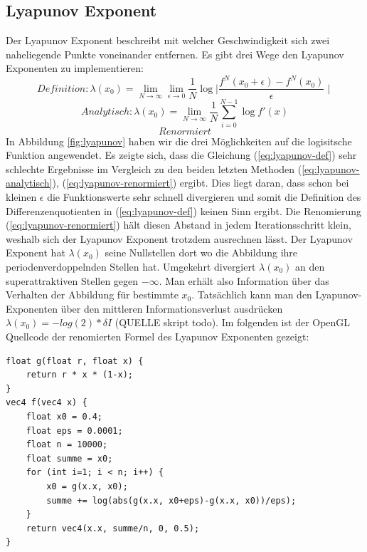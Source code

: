 \documentclass{scrartcl}
\begin{document}
\subsection{Lyapunov Exponent}
Der Lyapunov Exponent beschreibt mit welcher Geschwindigkeit sich zwei naheliegende Punkte voneinander entfernen. 
Es gibt drei Wege den Lyapunov Exponenten zu implementieren:
\begin{equation}
Definition: \lambda(x_0) = \lim_{N \rightarrow \infty}\lim_{\epsilon \rightarrow 0} \frac{1}{N}\log{\mid \frac{f^N(x_0+\epsilon)- f^N(x_0)}{\epsilon} \mid} 
\label{eq:lyapunov-def}
\end{equation}
\begin{equation}
Analytisch: \lambda(x_0) = \lim_{N \rightarrow \infty} \frac{1}{N} \sum_{i=0}^{N-1}  \log{f'(x)} 
\label{eq:lyapunov-analytisch}
\end{equation}
\begin{equation}
Renormiert
\label{eq:lyapunov-renormiert}
\end{equation}
In Abbildung \ref{fig:lyapunov} haben wir die drei Möglichkeiten auf die logisitsche Funktion angewendet.
Es zeigte sich, dass die Gleichung (\ref{eq:lyapunov-def}) sehr schlechte Ergebnisse im Vergleich zu den beiden letzten Methoden (\ref{eq:lyapunov-analytisch}), (\ref{eq:lyapunov-renormiert}) ergibt.
Dies liegt daran, dass schon bei kleinen $\epsilon$ die Funktionswerte sehr schnell divergieren und somit die Definition des Differenzenquotienten in (\ref{eq:lyapunov-def}) keinen Sinn ergibt.
Die Renomierung (\ref{eq:lyapunov-renormiert}) hält diesen Abstand in jedem Iterationsschritt klein, weshalb sich der Lyapunov Exponent trotzdem ausrechnen lässt.
Der Lyapunov Exponent hat $\lambda(x_0)$ seine Nullstellen dort wo die Abbildung ihre periodenverdoppelnden Stellen hat. Umgekehrt divergiert $\lambda(x_0)$ an den superattraktiven Stellen gegen $-\infty$.
Man erhält also Information über das Verhalten der Abbildung für bestimmte $x_0$.
Tatsächlich kann man den Lyapunov-Exponenten über den mittleren Informationsverlust ausdrücken $\lambda(x_0)=-log(2)*\delta I$ (QUELLE skript todo).
Im folgenden ist der OpenGL Quellcode der renomierten Formel des Lyapunov Exponenten gezeigt:
\begin{lstlisting}
float g(float r, float x) {
    return r * x * (1-x);
}
vec4 f(vec4 x) {
    float x0 = 0.4;
    float eps = 0.0001;
    float n = 10000;
    float summe = x0;
    for (int i=1; i < n; i++) {
        x0 = g(x.x, x0);
        summe += log(abs(g(x.x, x0+eps)-g(x.x, x0))/eps);
    }
    return vec4(x.x, summe/n, 0, 0.5);
}
\end{lstlisting}
\end{document}
